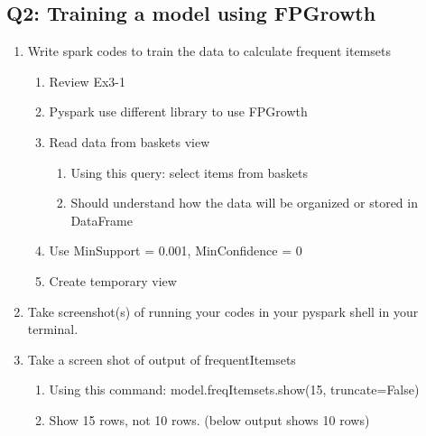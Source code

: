 \documentclass[]{article}
\begin{document}
\clearpage

\subsection*{Q2: Training a model using FPGrowth}
\begin{enumerate}[before=\itshape,label=\arabic*.]
	\item Write spark codes to train the data to calculate frequent itemsets
	\begin{enumerate}[before=\itshape,label=\alph*.]
		\item Review Ex3-1
		\item Pyspark use different library to use FPGrowth
		\item Read data from baskets view
		\begin{enumerate}[before=\itshape,label=\roman*.]
			\item Using this query: select items from baskets
			\item Should understand how the data will be organized or stored in DataFrame
		\end{enumerate}
		\item Use MinSupport = 0.001, MinConfidence = 0
		\item Create temporary view
	\end{enumerate}
	\item Take screenshot(s) of running your codes in your pyspark shell in your terminal.
	\item Take a screen shot of output of frequentItemsets
	\begin{enumerate}[before=\itshape,label=\alph*.]
		\item Using this command: model.freqItemsets.show(15, truncate=False)
		\item Show 15 rows, not 10 rows. (below output shows 10 rows)
	\end{enumerate}
\end{enumerate} 
\end{document}
